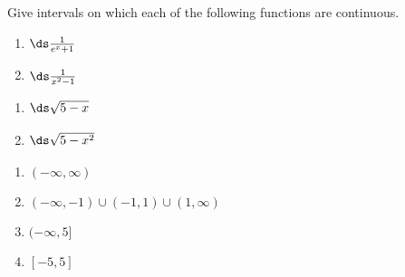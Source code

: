 {Give intervals on which each of the following functions are continuous.

\noindent\begin{minipage}[t]{.49\linewidth}
\begin{enumerate}
\item		$\ds \frac{1}{e^x+1}$
\item		$\ds \frac{1}{x^2-1}$
\end{enumerate}
\end{minipage}
\begin{minipage}[t]{.49\linewidth}
\begin{enumerate}\addtocounter{enumii}{2}
\item		$\ds \sqrt{5-x}\phantom{\frac{1}{e^x+1}}$
\item		$\ds \sqrt{5-x^2}\phantom{\frac{1}{x^2-1}}$
\end{enumerate}
\end{minipage}
}
{\begin{enumerate}
\item		$(-\infty,\infty)$
\item		$(-\infty,-1)\cup (-1,1) \cup (1,\infty)$
\item		$(-\infty,5]$
\item		$[-5,5]$
\end{enumerate}
}
